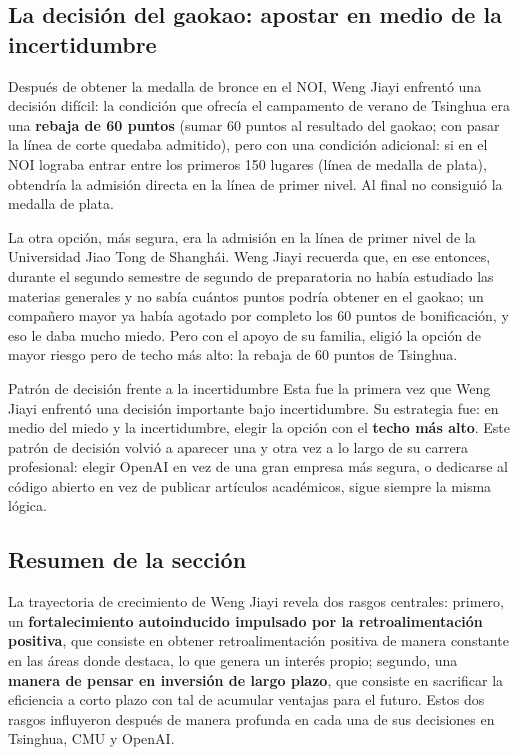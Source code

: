 \documentclass[a4paper]{article}
\begin{document}
\subsection{La decisión del gaokao: apostar en medio de la incertidumbre}

Después de obtener la medalla de bronce en el NOI, Weng Jiayi enfrentó una decisión difícil: la condición que ofrecía el campamento de verano de Tsinghua era una \textbf{rebaja de 60 puntos} (sumar 60 puntos al resultado del gaokao; con pasar la línea de corte quedaba admitido), pero con una condición adicional: si en el NOI lograba entrar entre los primeros 150 lugares (línea de medalla de plata), obtendría la admisión directa en la línea de primer nivel. Al final no consiguió la medalla de plata.

La otra opción, más segura, era la admisión en la línea de primer nivel de la Universidad Jiao Tong de Shanghái. Weng Jiayi recuerda que, en ese entonces, durante el segundo semestre de segundo de preparatoria no había estudiado las materias generales y no sabía cuántos puntos podría obtener en el gaokao; un compañero mayor ya había agotado por completo los 60 puntos de bonificación, y eso le daba mucho miedo. Pero con el apoyo de su familia, eligió la opción de mayor riesgo pero de techo más alto: la rebaja de 60 puntos de Tsinghua.

\begin{warningbox}{Patrón de decisión frente a la incertidumbre}
Esta fue la primera vez que Weng Jiayi enfrentó una decisión importante bajo incertidumbre. Su estrategia fue: en medio del miedo y la incertidumbre, elegir la opción con el \textbf{techo más alto}. Este patrón de decisión volvió a aparecer una y otra vez a lo largo de su carrera profesional: elegir OpenAI en vez de una gran empresa más segura, o dedicarse al código abierto en vez de publicar artículos académicos, sigue siempre la misma lógica.
\end{warningbox}

\subsection{Resumen de la sección}

La trayectoria de crecimiento de Weng Jiayi revela dos rasgos centrales: primero, un \textbf{fortalecimiento autoinducido impulsado por la retroalimentación positiva}, que consiste en obtener retroalimentación positiva de manera constante en las áreas donde destaca, lo que genera un interés propio; segundo, una \textbf{manera de pensar en inversión de largo plazo}, que consiste en sacrificar la eficiencia a corto plazo con tal de acumular ventajas para el futuro. Estos dos rasgos influyeron después de manera profunda en cada una de sus decisiones en Tsinghua, CMU y OpenAI.
\end{document}
